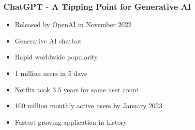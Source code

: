\begin{frame}[fragile]\frametitle{ChatGPT - A Tipping Point for Generative AI}
    \begin{itemize}
        \item Released by OpenAI in November 2022
        \item Generative AI chatbot
        \item Rapid worldwide popularity
        \item 1 million users in 5 days
        \item Netflix took 3.5 years for same user count
        \item 100 million monthly active users by January 2023
        \item Fastest-growing application in history
    \end{itemize}
\end{frame}


	


